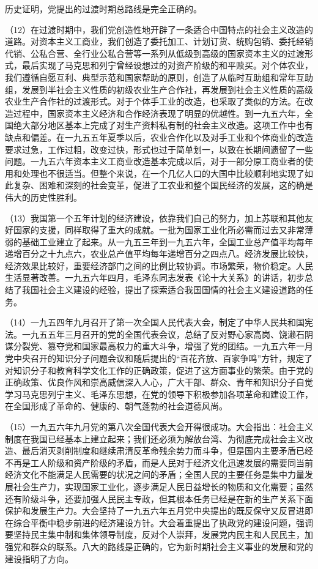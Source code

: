 历史证明，党提出的过渡时期总路线是完全正确的。

（12）在过渡时期中，我们党创造性地开辟了一条适合中国特点的社会主义改造的道路。对资本主义工商业，我们创造了委托加工、计划订货、统购包销、委托经销代销、公私合营、全行业公私合营等一系列从低级到高级的国家资本主义的过渡形式，最后实现了马克思和列宁曾经设想过的对资产阶级的和平赎买。对个体农业，我们遵循自愿互利、典型示范和国家帮助的原则，创造了从临时互助组和常年互助组，发展到半社会主义性质的初级农业生产合作社，再发展到社会主义性质的高级农业生产合作社的过渡形式。对于个体手工业的改造，也采取了类似的方法。在改造过程中，国家资本主义经济和合作经济表现了明显的优越性。到一九五六年，全国绝大部分地区基本上完成了对生产资料私有制的社会主义改造。这项工作中也有缺点和偏差。在一九五五年夏季以后，农业合作化以及对手工业和个体商业的改造要求过急，工作过粗，改变过快，形式也过于简单划一，以致在长期间遗留了一些问题。一九五六年资本主义工商业改造基本完成以后，对于一部分原工商业者的使用和处理也不很适当。但整个来说，在一个几亿人口的大国中比较顺利地实现了如此复杂、困难和深刻的社会变革，促进了工农业和整个国民经济的发展，这的确是伟大的历史性胜利。

（13）我国第一个五年计划的经济建设，依靠我们自己的努力，加上苏联和其他友好国家的支援，同样取得了重大的成就。一批为国家工业化所必需而过去又非常薄弱的基础工业建立了起来。从一九五三年到一九五六年，全国工业总产值平均每年递增百分之十九点六，农业总产值平均每年递增百分之四点八。经济发展比较快，经济效果比较好，重要经济部门之间的比例比较协调。市场繁荣，物价稳定。人民生活显著改善。一九五六年四月，毛泽东同志发表《论十大关系》的讲话，初步总结了我国社会主义建设的经验，提出了探索适合我国国情的社会主义建设道路的任务。

（14）一九五四年九月召开了第一次全国人民代表大会，制定了中华人民共和国宪法。一九五五年三月召开的党的全国代表会议，总结了反对野心家高岗、饶濑石阴谋分裂党、篡夺党和国家最高权力的重大斗争，增强了党的团结。一九五六年一月党中央召开的知识分子问题会议和随后提出的“百花齐放、百家争鸣”方针，规定了对知识分子和教育科学文化工作的正确政策，促进了这方面事业的繁荣。由于党的正确政策、优良作风和崇高威信深入人心，广大干部、群众、青年和知识分子自觉学习马克思列宁主义、毛泽东思想，在党的领导下积极参加各项革命和建设工作，在全国形成了革命的、健康的、朝气蓬勃的社会道德风尚。

（15）一九五六年九月党的第八次全国代表大会开得很成功。大会指出：社会主义制度在我国已经基本上建立起来；我们还必须为解放台湾、为彻底完成社会主义改造、最后消灭剥削制度和继续肃清反革命残余势力而斗争，但是国内主要矛盾已经不再是工人阶级和资产阶级的矛盾，而是人民对于经济文化迅速发展的需要同当前经济文化不能满足人民需要的状况之间的矛盾；全国人民的主要任务是集中力量发展社会生产力，实现国家工业化，逐步满足人民日益增长的物质和文化需要；虽然还有阶级斗争，还要加强人民民主专政，但其根本任务已经是在新的生产关系下面保护和发展生产力。大会坚持了一九五六年五月党中央提出的既反保守又反冒进即在综合平衡中稳步前进的经济建设方针。大会着重提出了执政党的建设问题，强调要坚持民主集中制和集体领导制度，反对个人崇拜，发展党内民主和人民民主，加强党和群众的联系。八大的路线是正确的，它为新时期社会主义事业的发展和党的建设指明了方向。

